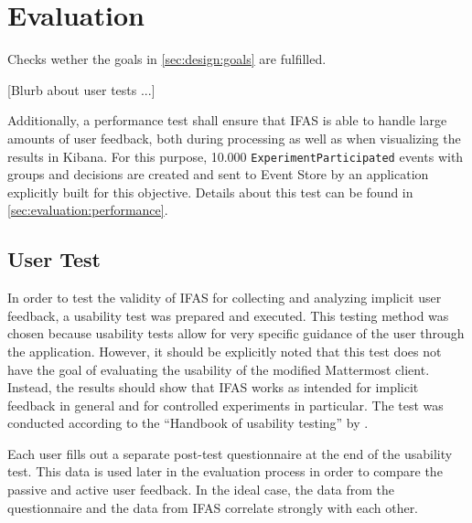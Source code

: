 %
\chapter{Evaluation}
\label{ch:evaluation}


Checks wether the goals in \cref{sec:design:goals} are fulfilled.

[Blurb about user tests ...]

Additionally, a performance test shall ensure that \acf{IFAS} is able to handle large amounts of user feedback, both during processing as well as when visualizing the results in Kibana.
For this purpose, 10.000 \texttt{ExperimentParticipated} events with groups and decisions are created and sent to Event Store by an application explicitly built for this objective.
Details about this test can be found in \cref{sec:evaluation:performance}.


\section{User Test}
\label{sec:evaluation:user}

In order to test the validity of \ac{IFAS} for collecting and analyzing implicit user feedback, a usability test was prepared and executed.
This testing method was chosen because usability tests allow for very specific guidance of the user through the application.
However, it should be explicitly noted that this test does not have the goal of evaluating the usability of the modified Mattermost client.
Instead, the results should show that \ac{IFAS} works as intended for implicit feedback in general and for controlled experiments in particular.
The test was conducted according to the ``Handbook of usability testing'' by \citet{rubin2008handbook}.

Each user fills out a separate post-test questionnaire at the end of the usability test.
This data is used later in the evaluation process in order to compare the passive and active user feedback.
In the ideal case, the data from the questionnaire and the data from \ac{IFAS} correlate strongly with each other.

